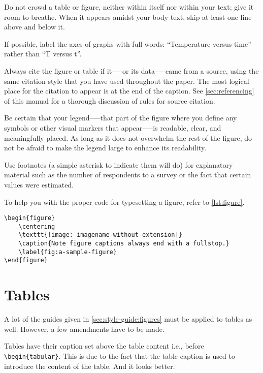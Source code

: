 Do not crowd a table or figure, neither within itself nor within your text; give it room to breathe. When it appears amidst your body text, skip at least one line above and below it.

If possible, label the axes of graphs with full words: ``Temperature versus time'' rather than ``T versus t''.

Always cite the figure or table if it—--or its data—--came from a source, using the same citation style that you have used throughout the paper. The most logical place for the citation to appear is at the end of the caption. See \cref{sec:referencing} of this manual for a thorough discussion of rules for source citation.

Be certain that your legend—--that part of the figure where you define any symbols or other visual markers that appear—--is readable, clear, and meaningfully placed. As long as it does not overwhelm the rest of the figure, do not be afraid to make the legend large to enhance its readability.

Use footnotes (a simple asterisk to indicate them will do) for explanatory material such as the number of respondents to a survey or the fact that certain values were estimated.

To help you with the proper code for typesetting a figure, refer to \cref{lst:figure}.

\begin{lstlisting}[float,language={[LaTeX]TeX}, caption={Sample code for type setting a figure.},label={lst:figure}]
\begin{figure}
    \centering
    \texttt{[image: imagename-without-extension]}
    \caption{Note figure captions always end with a fullstop.}
    \label{fig:a-sample-figure}
\end{figure}
\end{lstlisting}



\section{Tables}\label{sec:style-guide:tables}

A lot of the guides given in \cref{sec:style-guide:figures} must be applied to tables as well.
However, a few amendments have to be made.

Tables have their caption set above the table content i.e., before \lstinline!\begin{tabular}!.
This is due to the fact that the table caption is used to introduce the content of the table.
And it looks better.


